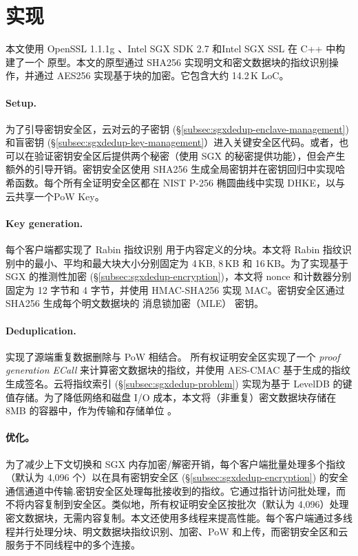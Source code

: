 \section{实现}
\label{sec:sgxdedup-implementation}

本文使用 OpenSSL 1.1.1g \cite{openssl}、Intel SGX SDK 2.7 \cite{sgx} 和Intel SGX SSL \cite{sgxssl} 在 C++ 中构建了一个 \sysnameS 原型。本文的原型通过 SHA256 实现明文和密文数据块的指纹识别操作，并通过 AES256 实现基于块的加密。它包含大约 14.2\,K LoC。

\paragraph*{Setup.} 
为了引导密钥安全区，云对云的子密钥 (\S\ref{subsec:sgxdedup-enclave-management}) 和盲密钥 (\S\ref{subsec:sgxdedup-key-management}）进入关键安全区代码。或者，\sysnameS 也可以在验证密钥安全区后提供两个秘密（使用 SGX \cite{sgx} 的秘密提供功能），但会产生额外的引导开销。密钥安全区使用 SHA256 生成全局密钥并在密钥回归中实现哈希函数。每个所有全证明安全区都在 NIST P-256 椭圆曲线中实现 DHKE，以与云共享一个PoW Key。

\paragraph*{Key generation.} 每个客户端都实现了 Rabin 指纹识别 \cite{rabin81} 用于内容定义的分块。本文将 Rabin 指纹识别中的最小、平均和最大块大小分别固定为 4\,KB, 8\,KB 和 16\,KB。为了实现基于 SGX 的推测性加密 (\S\ref{subsec:sgxdedup-encryption})，本文将 nonce 和计数器分别固定为 12 字节和 4 字节，并使用 HMAC-SHA256 实现 MAC。密钥安全区通过 SHA256 生成每个明文数据块的 消息锁加密（MLE） 密钥。

\paragraph*{Deduplication.} \sysnameS 实现了源端重复数据删除与 PoW 相结合。 所有权证明安全区实现了一个 \textit{ proof generation ECall} 来计算密文数据块的指纹，并使用 AES-CMAC 基于生成的指纹生成签名。云将指纹索引 (\S\ref{subsec:sgxdedup-problem}) 实现为基于 LevelDB \cite{leveldb} 的键值存储。为了降低网络和磁盘 I/O 成本，本文将（非重复）密文数据块存储在 8MB 的容器中，作为传输和存储单位 \cite{lillibridge13}。

\paragraph*{优化。} 为了减少上下文切换和 SGX 内存加密/解密开销，每个客户端批量处理多个指纹（默认为 4,096 个）以在具有密钥安全区 (\S\ref{subsec:sgxdedup-encryption}) 的安全通信通道中传输.密钥安全区处理每批接收到的指纹。它通过指针访问批处理，而不将内容复制到安全区\cite{harnik2018SGX}。类似地，所有权证明安全区按批次（默认为 4,096）处理密文数据块，无需内容复制。本文还使用多线程来提高性能。每个客户端通过多线程并行处理分块、明文数据块指纹识别、加密、PoW 和上传，而密钥安全区和云服务于不同线程中的多个连接。
